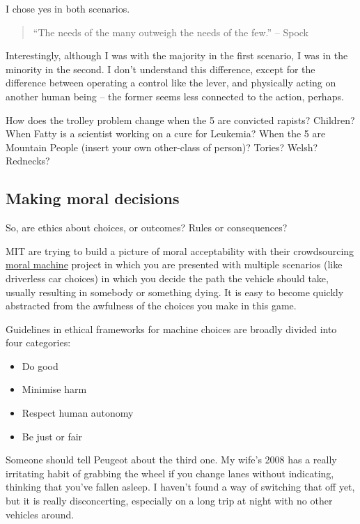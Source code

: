 \documentclass[
]{book}
\providecommand{\tightlist}{%
  \setlength{\itemsep}{0pt}\setlength{\parskip}{0pt}}
\begin{document}
I chose yes in both scenarios.

\begin{quote}
``The needs of the many outweigh the needs of the few.'' -- Spock
\end{quote}

Interestingly, although I was with the majority in the first scenario, I was in the minority in the second. I don't understand this difference, except for the difference between operating a control like the lever, and physically acting on another human being -- the former seems less connected to the action, perhaps.

\begin{description}
\tightlist
\item[Other scenarios]
How does the trolley problem change when the 5 are convicted rapists? Children? When Fatty is a scientist working on a cure for Leukemia? When the 5 are Mountain People (insert your own other-class of person)? Tories? Welsh? Rednecks?
\end{description}

\hypertarget{making-moral-decisions}{%
\subsection{Making moral decisions}\label{making-moral-decisions}}

So, are ethics about choices, or outcomes? Rules or consequences?

MIT are trying to build a picture of moral acceptability with their crowdsourcing \href{https://www.moralmachine.net/}{moral machine} project in which you are presented with multiple scenarios (like driverless car choices) in which you decide the path the vehicle should take, usually resulting in somebody or something dying. It is easy to become quickly abstracted from the awfulness of the choices you make in this game.

Guidelines in ethical frameworks for machine choices are broadly divided into four categories:

\begin{itemize}
\tightlist
\item
  Do good
\item
  Minimise harm
\item
  Respect human autonomy
\item
  Be just or fair
\end{itemize}

Someone should tell Peugeot about the third one. My wife's 2008 has a really irritating habit of grabbing the wheel if you change lanes without indicating, thinking that you've fallen asleep. I haven't found a way of switching that off yet, but it is really disconcerting, especially on a long trip at night with no other vehicles around.
\end{document}
